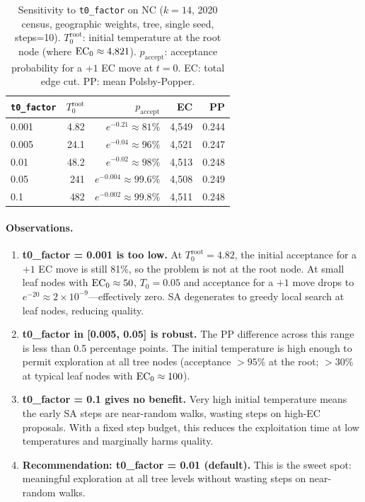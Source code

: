 \begin{table}[t]
\centering
\caption{%
  Sensitivity to \texttt{t0\_factor} on NC ($k=14$, 2020 census,
  geographic weights, \geosec{} tree, single seed, steps=10).
  $T_0^{\mathrm{root}}$: initial temperature at the root node
  (where $\mathrm{EC}_0 \approx 4{,}821$).
  $p_{\mathrm{accept}}$: acceptance probability for a $+1$ EC move at $t=0$.
  EC: total edge cut. PP: mean Polsby-Popper.
}
\label{tab:t0}
\renewcommand{\arraystretch}{1.25}
\begin{tabular}{@{}lrrrr@{}}
\toprule
\texttt{t0\_factor} & $T_0^{\mathrm{root}}$ & $p_{\mathrm{accept}}$ & EC & PP \\
\midrule
0.001 & 4.82  & $e^{-0.21} \approx 81\%$ & 4{,}549 & 0.244 \\
0.005 & 24.1  & $e^{-0.04} \approx 96\%$ & 4{,}521 & 0.247 \\
0.01  & 48.2  & $e^{-0.02} \approx 98\%$ & 4{,}513 & 0.248 \\
0.05  & 241   & $e^{-0.004} \approx 99.6\%$ & 4{,}508 & 0.249 \\
0.1   & 482   & $e^{-0.002} \approx 99.8\%$ & 4{,}511 & 0.248 \\
\bottomrule
\end{tabular}
\end{table}

\paragraph{Observations.}
\begin{enumerate}
\item \textbf{t0\_factor = 0.001 is too low.}
  At $T_0^{\mathrm{root}} = 4.82$, the initial acceptance for a $+1$ EC move
  is still 81\%, so the problem is not at the root node.
  At small leaf nodes with $\mathrm{EC}_0 \approx 50$, $T_0 = 0.05$ and acceptance
  for a $+1$ move drops to $e^{-20} \approx 2 \times 10^{-9}$---effectively
  zero.
  SA degenerates to greedy local search at leaf nodes, reducing quality.

\item \textbf{t0\_factor in [0.005, 0.05] is robust.}
  The PP difference across this range is less than 0.5 percentage points.
  The initial temperature is high enough to permit exploration at all
  tree nodes (acceptance $>95\%$ at the root; $>30\%$ at typical leaf nodes
  with $\mathrm{EC}_0 \approx 100$).

\item \textbf{t0\_factor = 0.1 gives no benefit.}
  Very high initial temperature means the early SA steps are near-random
  walks, wasting steps on high-EC proposals.
  With a fixed step budget, this reduces the exploitation time at low
  temperatures and marginally harms quality.

\item \textbf{Recommendation: t0\_factor = 0.01 (default).}
  This is the sweet spot: meaningful exploration at all tree levels without
  wasting steps on near-random walks.
\end{enumerate}

